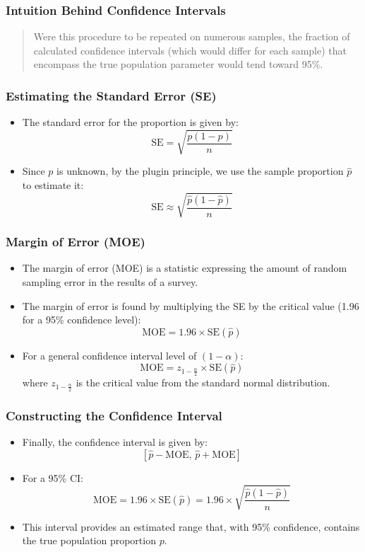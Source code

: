 \documentclass[handout]{beamer} %
\begin{document}
\begin{frame}
    \frametitle{Intuition Behind Confidence Intervals}
    \begin{quote}
        Were this procedure to be repeated on numerous samples, the fraction of calculated confidence intervals (which would differ for each sample) that encompass the true population parameter would tend toward 95\%.
    \end{quote}
\end{frame}



\begin{frame}
    \frametitle{Estimating the Standard Error (SE)}
    \begin{itemize}
        \item The standard error for the proportion is given by:
        \[
        \text{SE} = \sqrt{\frac{p(1-p)}{n}}
        \]
        \item Since \( p \) is unknown, by the plugin principle, we use the sample proportion \( \hat{p} \) to estimate it:
        \[
        \text{SE} \approx \sqrt{\frac{\hat{p}(1-\hat{p})}{n}}
        \]
    \end{itemize}
\end{frame}

\begin{frame}
    \frametitle{Margin of Error (MOE)}
    \begin{itemize}
        \item The margin of error (MOE) is a statistic expressing the amount of random sampling error in the results of a survey.
        \item The margin of error is found by multiplying the SE by the critical value (1.96 for a 95\% confidence level):
        \[
            \text{MOE} = 1.96 \times \text{SE}(\hat{p})
        \]
        \item For a general confidence interval level of $(1-\alpha)$:
        \[
            \text{MOE} = z_{1-\frac{\alpha}{2}} \times \text{SE}(\hat{p})
        \]
        where $z_{1-\frac{\alpha}{2}}$ is the critical value from the standard normal distribution.
    \end{itemize}
\end{frame}


\begin{frame}
    \frametitle{Constructing the Confidence Interval}
    \begin{itemize}
        \item Finally, the confidence interval is given by:
    \[
    \left[\hat{p} - \text{MOE}, \, \hat{p} + \text{MOE}\right]
    \]
    \item For a 95\% CI:
       \[
    \text{MOE} = 1.96 \times \text{SE}(\hat{p}) = 1.96 \times \sqrt{\frac{\hat{p}(1-\hat{p})}{n}}
    \] 
        \item This interval provides an estimated range that, with 95\% confidence, contains the true population proportion \( p \).
    \end{itemize}
\end{frame}
\end{document}
